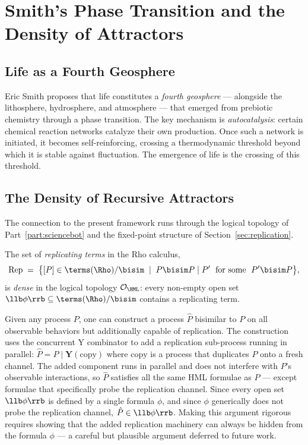 \chapter{Smith's Phase Transition and the Density of Attractors}
\label{sec:phase}

\section{Life as a Fourth Geosphere}

Eric Smith proposes that life constitutes a \emph{fourth geosphere}
--- alongside the lithosphere, hydrosphere, and atmosphere ---
that emerged from prebiotic chemistry through a phase transition.
The key mechanism is \emph{autocatalysis}: certain chemical reaction
networks catalyze their own production.
Once such a network is initiated, it becomes self-reinforcing,
crossing a thermodynamic threshold beyond which it is stable against
fluctuation.
The emergence of life is the crossing of this threshold.

\section{The Density of Recursive Attractors}

The connection to the present framework runs through the logical
topology of Part~\ref{part:sciencebot} and the fixed-point structure of
Section~\ref{sec:replication}.

\begin{conjecture}
\label{conj:density}
The set of \emph{replicating terms} in the Rho calculus,
\[
  \mathrm{Rep} \;=\;
  \bigl\{ [P] \in \terms(\Rho)/{\bisim} \;\mid\;
    P \bisim P \mid P' \;\text{ for some }\; P' \bisim P \bigr\},
\]
is \emph{dense} in the logical topology $\mathcal{O}_{\HML}$:
every non-empty open set $\llb\phi\rrb \subseteq \terms(\Rho)/{\bisim}$
contains a replicating term.
\end{conjecture}

\begin{remark}
Given any process $P$, one can construct a process $\hat{P}$
bisimilar to $P$ on all observable behaviors but additionally
capable of replication.
The construction uses the concurrent Y combinator to add
a replication sub-process running in parallel: 
$\hat{P} = P \mid \mathbf{Y}(\mathrm{copy})$
where $\mathrm{copy}$ is a process that duplicates $P$ onto a
fresh channel.
The added component runs in parallel and does not interfere with
$P$'s observable interactions, so $\hat{P}$ satisfies all the
same HML formulae as $P$ --- except formulae that specifically
probe the replication channel.
Since every open set $\llb\phi\rrb$ is defined by a single formula
$\phi$, and since $\phi$ generically does not probe the replication
channel, $\hat{P} \in \llb\phi\rrb$.
Making this argument rigorous requires showing that the added
replication machinery can always be hidden from the formula $\phi$
--- a careful but plausible argument deferred to future work.
\end{remark}

